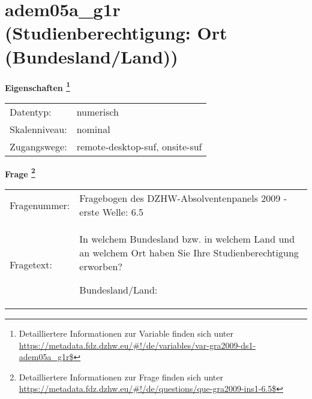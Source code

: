 
    \setcounter{footnote}{0}

    \vspace*{-1.8cm}
	\section{adem05a\_g1r (Studienberechtigung: Ort (Bundesland/Land))}
	\label{section:adem05a_g1r}



    \vspace*{0.5cm}
    \noindent\textbf{Eigenschaften
	\footnote{Detailliertere Informationen zur Variable finden sich unter
		\url{https://metadata.fdz.dzhw.eu/\#!/de/variables/var-gra2009-ds1-adem05a_g1r$}}}\\
	\begin{tabularx}{\hsize}{@{}lX}
	Datentyp: & numerisch \\
	Skalenniveau: & nominal \\
	Zugangswege: &
	  remote-desktop-suf, 
	  onsite-suf
 \\
    \end{tabularx}



				\vspace*{0.5cm}
                \noindent\textbf{Frage
	                \footnote{Detailliertere Informationen zur Frage finden sich unter
		              \url{https://metadata.fdz.dzhw.eu/\#!/de/questions/que-gra2009-ins1-6.5$}}}\\
				\begin{tabularx}{\hsize}{@{}lX}
					Fragenummer: &
					  Fragebogen des DZHW-Absolventenpanels 2009 - erste Welle:
					  6.5
 \\
					Fragetext: & In welchem Bundesland bzw. in welchem Land und an welchem Ort haben Sie Ihre Studienberechtigung erworben?\par  Bundesland/Land: \\
				\end{tabularx}





